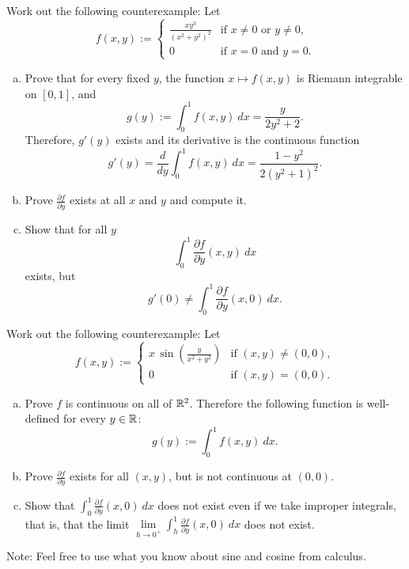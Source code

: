 \begin{exercise}
Work out the following counterexample:  Let
\begin{equation*}
f(x,y) :=
\begin{cases}
\frac{xy^3}{{(x^2+y^2)}^2} & \text{if } x\not=0 \text{ or } y\not= 0, \\
0                          & \text{if } x=0 \text{ and } y=0.
\end{cases}
\end{equation*}
\begin{enumerate}[a)]
\item
Prove that for every fixed $y$, the function $x \mapsto f(x,y)$ is
Riemann integrable on $[0,1]$, and
\begin{equation*}
g(y) := \int_0^1 f(x,y) ~ dx = \frac{y}{2y^2+2} .
\end{equation*}
Therefore, $g'(y)$ exists and its derivative is the continuous function
\begin{equation*}
g'(y) =
\frac{d}{dy} \int_0^1 f(x,y) ~ dx
=
\frac{1-y^2}{2{(y^2+1)}^2} .
\end{equation*}
\item
Prove $\frac{\partial f}{\partial y}$ exists at all $x$ and $y$ and
compute it.
\item
Show that for all $y$
\begin{equation*}
\int_0^1 \frac{\partial f}{\partial y} (x,y) ~ dx
\end{equation*}
exists, but
\begin{equation*}
g'(0) \not= \int_0^1 \frac{\partial f}{\partial y} (x,0) ~ dx .
\end{equation*}
\end{enumerate}
\end{exercise}

\begin{exercise}
\pagebreak[2]
Work out the following counterexample:  Let
\begin{equation*}
f(x,y) :=
\begin{cases}
x \,\sin \left(\frac{y}{x^2+y^2}\right) & \text{if } (x,y) \not= (0,0),\\
0                                       & \text{if } (x,y)=(0,0).
\end{cases}
\end{equation*}
\begin{enumerate}[a)]
\item
Prove $f$ is continuous on all of ${\mathbb{R}}^2$.
Therefore the following function is well-defined for every $y \in {\mathbb{R}}$:
\begin{equation*}
g(y) := \int_0^1 f(x,y) ~ dx .
\end{equation*}
\item
Prove $\frac{\partial f}{\partial y}$ exists for all $(x,y)$,
but is not continuous at $(0,0)$.
\item
Show that $\int_0^1 \frac{\partial f}{\partial y}(x,0) ~ dx$ does not
exist even if we take improper integrals, that is,
that the limit
$\lim\limits_{h \to 0^+} \int_h^1 \frac{\partial f}{\partial y}(x,0) ~ dx$
does not exist.
\end{enumerate}
Note: Feel free to use what you know about sine and cosine from calculus.
\end{exercise}

